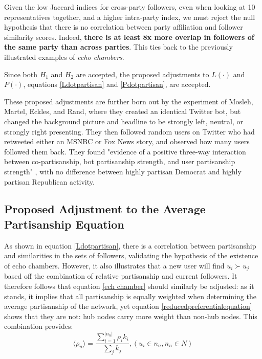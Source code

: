 \documentclass[preprint,review,12pt]{elsarticle}
\begin{document}
Given the low Jaccard indices for cross-party followers, even when looking at 10 representatives together, and a higher intra-party index, we must reject the null hypothesis that there is no correlation between party affiliation and follower similarity scores. Indeed, \textbf{there is at least 8x more overlap in followers of the same party than across parties}. This ties back to the previously illustrated examples of \textit{echo chambers}.

Since both $H_1$ and $H_2$ are accepted, the proposed adjustments to $L(\cdot)$ and $P(\cdot)$, equations \ref{Ldotpartisan} and \ref{Pdotpartisan}, are accepted.

These proposed adjustments are further born out by the experiment of Mosleh, Martel, Eckles, and Rand, where they created an identical Twitter bot, but changed the background picture and headline to be strongly left, neutral, or strongly right presenting. They then followed random users on Twitter who had retweeted either an MSNBC or Fox News story, and observed how many users followed them back. They found "evidence of a positive three-way interaction between co-partisanship, bot partisanship strength, and user partisanship strength" \cite{mosleh2020shared}, with no difference between highly partisan Democrat and highly partisan Republican activity. 

\subsection{Proposed Adjustment to the Average Partisanship Equation}
As shown in equation \ref{Ldotpartisan}, there is a correlation between partisanship and similarities in the sets of followers, validating the hypothesis of the existence of echo chambers. However, it also illustrates that a new user will find $u_i \succ u_j$ based off the combination of relative partisanship and current followers. It therefore follows that equation \ref{ech chamber} should similarly be adjusted: as it stands, it implies that all partisanship is equally weighted when determining the average partisanship of the network, yet equation \ref{reducedpreferentialequation} shows that they are not: hub nodes carry more weight than non-hub nodes. This combination provides:
\begin{equation}
    \label{echo chamber by followers}
        \langle \rho_n \rangle = \frac{\sum_{i=1}^{|n_n|}\rho_ik_i}{\sum_{j}k_j}, (u_i \in n_n, n_n \in N)
 \end{equation}
 
\end{document}
